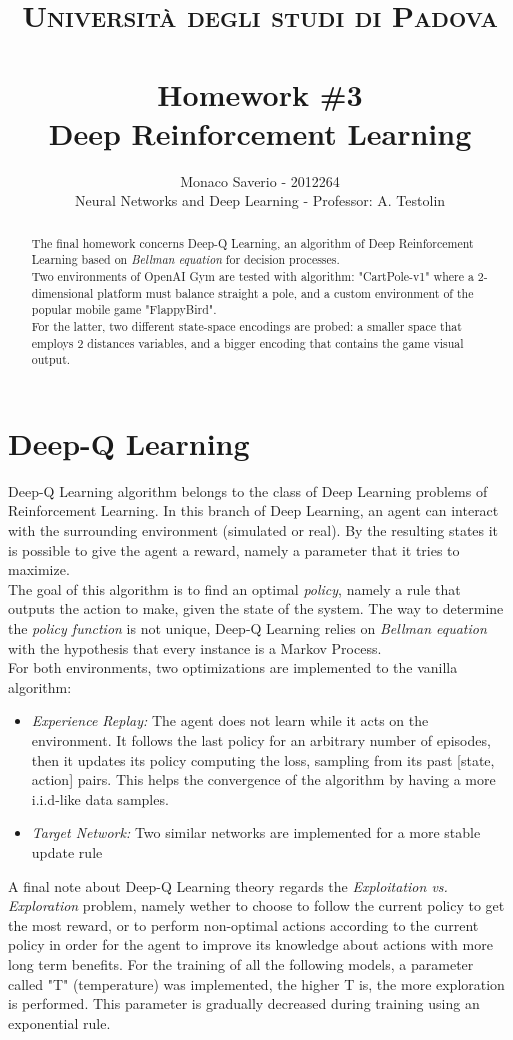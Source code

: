 \documentclass[11pt,a4paper,twocolumn]{IEEEtran}
\author{Monaco Saverio - 2012264 \sepline \\Neural Networks and Deep Learning - Professor: A. Testolin}
\title{{\normalsize\textsc{Università degli studi di Padova}}\vspace{-.5cm} \\ \sepline\\ \textbf{Homework \#3
\\ Deep Reinforcement Learning}}
\begin{document}
	\maketitle
	\begin{abstract} The final homework concerns Deep-Q Learning, an algorithm of Deep Reinforcement Learning based on \textit{Bellman equation} for decision processes.\\
	Two environments of OpenAI Gym are tested with algorithm: "CartPole-v1" where a 2-dimensional platform must balance straight a pole, and a custom environment of the popular mobile game "FlappyBird".\\
	For the latter, two different state-space encodings are probed: a smaller space that employs 2 distances variables, and a bigger encoding that contains the game visual output.
	\end{abstract}
    \section*{\textbf{Deep-Q Learning}}
    Deep-Q Learning algorithm belongs to the class of Deep Learning problems of Reinforcement Learning.
    In this branch of Deep Learning, an agent can interact with the surrounding environment (simulated or real). By the resulting states it is possible to give the agent a reward, namely a parameter that it tries to maximize.\\
    The goal of this algorithm is to find an optimal \textit{policy}, namely a rule that outputs the action to make, given the state of the system. The way to determine the \textit{policy function} is not unique, Deep-Q Learning relies on \textit{Bellman equation} with the hypothesis that every instance is a Markov Process.\medskip\\
    For both environments, two optimizations are implemented to the vanilla algorithm:
    \begin{itemize}
		\item \textit{Experience Replay:} The agent does not learn while it acts on the environment. It follows the last policy for an arbitrary number of episodes, then it updates its policy computing the loss, sampling from its past [state, action] pairs. This helps the convergence of the algorithm by having a more i.i.d-like data samples.
		\item \textit{Target Network:} Two similar networks are implemented for a more stable update rule
	\end{itemize}
	A final note about Deep-Q Learning theory regards the \textit{Exploitation vs. Exploration} problem, namely wether to choose to follow the current policy to get the most reward, or to perform non-optimal actions according to the current policy in order for the agent to improve its knowledge about actions with more long term benefits. For the training of all the following models, a parameter called "T" (temperature) was implemented, the higher T is, the more exploration is performed. This parameter is gradually decreased during training using an exponential rule.
\end{document}
